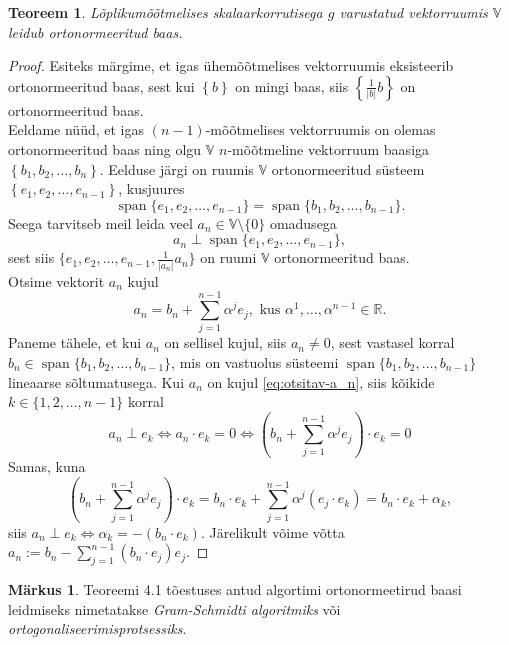 \documentclass[a4paper,12pt]{article}
\theoremstyle{plain}
\newtheorem{teoreem}{Teoreem}[section]
\theoremstyle{definition}
\newtheorem{markus}{Märkus}[section]
\numberwithin{equation}{section}
\DeclareMathOperator{\spn}{span}
\begin{document}
\begin{teoreem} \textnormal{\cite[teoreem II.7.3]{FA2}}
Lõplikumõõtmelises skalaarkorrutisega $g$ varustatud vektorruumis $\mathbb{V}$ leidub ortonormeeritud baas.
\end{teoreem}
\begin{proof}
Esiteks märgime, et igas ühemõõtmelises vektorruumis eksisteerib ortonormeeritud baas, sest kui $\left\lbrace b \right\rbrace$ on mingi baas, siis $\left\lbrace \frac{1}{|b|} b\right\rbrace$ on ortonormeeritud baas.\\
Eeldame nüüd, et igas $(n-1)$-mõõtmelises vektorruumis on olemas ortonormeeritud baas ning olgu $\mathbb{V}$ $n$-mõõtmeline vektorruum baasiga $\left\lbrace b_1, b_2, \dots, b_n \right\rbrace$. Eelduse järgi on ruumis $\mathbb{V}$ ortonormeeritud süsteem $\left\lbrace e_1, e_2, \dots, e_{n-1} \right\rbrace$, kusjuures
\[ \spn\{ e_1, e_2, \dots, e_{n-1}\} = \spn\{ b_1, b_2, \dots, b_{n-1}\}. \]
Seega tarvitseb meil leida veel $a_n \in \mathbb{V} \setminus \{0\}$ omadusega
\[a_n \perp \spn\{ e_1, e_2, \dots, e_{n-1}\},\]
sest siis $\{ e_1, e_2, \dots, e_{n-1}, \frac{1}{|a_n|}a_n\}$ on ruumi $\mathbb{V}$ ortonormeeritud baas.\\
Otsime vektorit $a_n$ kujul
\begin{equation} \label{eq:otsitav-a_n}
a_n = b_n + \sum_{j = 1}^{n-1} \alpha^j e_j, \text{ kus } \alpha^1, \dots, \alpha^{n-1} \in \mathbb{R}.
\end{equation}
Paneme tähele, et kui $a_n$ on sellisel kujul, siis $a_n \neq 0$, sest vastasel korral $b_n \in \spn\{ b_1, b_2, \dots, b_{n-1}\}$, mis on vastuolus süsteemi $\spn\{ b_1, b_2, \dots, b_{n-1}\}$ lineaarse sõltumatusega.
Kui $a_n$ on kujul \ref{eq:otsitav-a_n}, siis kõikide $k \in \{1, 2, \dots, n-1\}$ korral
\begin{equation*}
a_n \perp e_k \iff a_n \cdot e_k = 0 \iff \left(b_n + \sum_{j = 1}^{n-1} \alpha^j e_j\right) \cdot e_k = 0
\end{equation*}
Samas, kuna
\begin{equation*}
\left(b_n + \sum_{j = 1}^{n-1} \alpha^j e_j\right) \cdot e_k = b_n \cdot e_k + \sum_{j = 1}^{n-1} \alpha^j \left(e_j \cdot e_k \right) = b_n \cdot e_k + \alpha_k,
\end{equation*}
siis $a_n \perp e_k \iff \alpha_k = - \left(b_n \cdot e_k \right)$. \newline
Järelikult võime võtta $a_n := b_n - \sum_{j=1}^{n-1}\left(b_n \cdot e_j\right)e_j$.
\end{proof}
\begin{markus} \label{markus:gram-schmidt}
Teoreemi 4.1 tõestuses antud algortimi ortonormeetirud baasi leidmiseks nimetatakse \emph{Gram-Schmidti algoritmiks} või \emph{ortogonaliseerimisprotsessiks}.
\end{markus}
\end{document}
